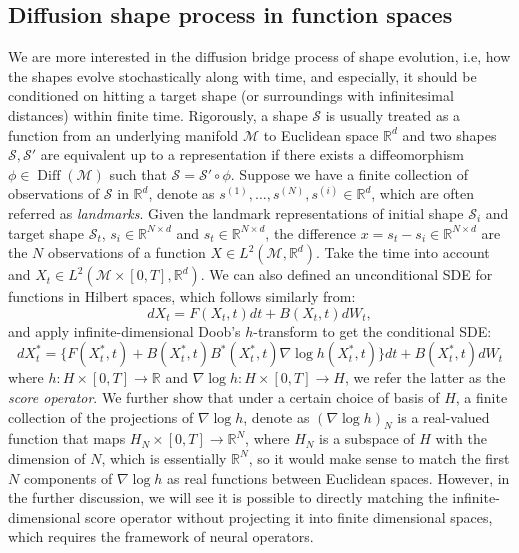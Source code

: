\documentclass{article}
\begin{document}
\subsection{Diffusion shape process in function spaces}
We are more interested in the diffusion bridge process of shape evolution, i.e, how the shapes evolve stochastically along with time, and especially, it should be conditioned on hitting a target shape (or surroundings with infinitesimal distances) within finite time. Rigorously, a shape $\mathcal{S}$ is usually treated as a function from an underlying manifold $\mathcal{M}$ to Euclidean space $\mathbb{R}^d$ and two shapes $\mathcal{S}, \mathcal{S}'$ are equivalent up to a representation if there exists a diffeomorphism $\phi\in\operatorname{Diff}(\mathcal{M})$ such that $\mathcal{S} = \mathcal{S}'\circ\phi$\cite{baker2023function}. Suppose we have a finite collection of observations of $\mathcal{S}$ in $\mathbb{R}^d$, denote as $s^{(1)},\dots,s^{(N)}, s^{(i)}\in\mathbb{R}^d$, which are often referred as \emph{landmarks}. Given the landmark representations of initial shape $\mathcal{S}_i$ and target shape $\mathcal{S}_t$, $s_i\in\mathbb{R}^{N\times d}$ and $s_t\in\mathbb{R}^{N\times d}$, the difference $x = s_t-s_i \in \mathbb{R}^{N\times d}$ are the $N$ observations of a function $X\in L^2(\mathcal{M},\mathbb{R}^d)$. Take the time into account and $X_t\in L^2(\mathcal{M}\times[0, T], \mathbb{R}^d)$. We can also defined an unconditional SDE for functions in Hilbert spaces, which follows similarly from:
\begin{equation}
    dX_t = F(X_t, t)dt + B(X_t, t)dW_t, 
\end{equation}
and apply infinite-dimensional Doob's $h$-transform\cite{baker2024conditioning} to get the conditional SDE:
\begin{equation}
    dX^*_t = \{F(X^*_t, t) + B(X^*_t, t)B^*(X^*_t, t)\nabla\log h(X^*_t,t)\}dt + B(X^*_t, t)dW_t
\end{equation}
where $h: H\times [0, T]\to\mathbb{R}$ and $\nabla\log h: H\times[0, T]\to H$, we refer the latter as the \emph{score operator}. We further show that under a certain choice of basis of $H$, a finite collection of the projections of $\nabla\log h$, denote as $(\nabla\log h)_N$ is a real-valued function that maps $H_N\times[0, T]\to\mathbb{R}^N$, where $H_N$ is a subspace of $H$ with the dimension of $N$, which is essentially $\mathbb{R}^N$, so it would make sense to match the first $N$ components of $\nabla\log h$ as real functions between Euclidean spaces. However, in the further discussion, we will see it is possible to directly matching the infinite-dimensional score operator without projecting it into finite dimensional spaces, which requires the framework of neural operators.
\end{document}
